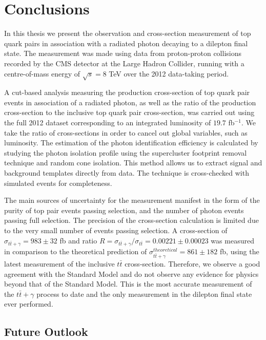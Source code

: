 \chapter*{Conclusions}\label{chap-conclusions}

In this thesis we present the observation and cross-section measurement of top quark pairs in association with a radiated photon decaying to a dilepton final state. The measurement was made using data from proton-proton collisions recorded by the CMS detector at the Large Hadron Collider, running with a centre-of-mass energy of $\sqrt{s} = 8$ TeV over the 2012 data-taking period. 

A cut-based analysis measuring the production cross-section of top quark pair events in association of a radiated photon, as well as the ratio of the production cross-section to the inclusive top quark pair cross-section, was carried out using the full 2012 dataset corresponding to an integrated luminosity of $19.7$ fb$^{-1}$. We take the ratio of cross-sections in order to cancel out global variables, such as luminosity. The estimation of the photon identification efficiency is calculated by studying the photon isolation profile using the supercluster footprint removal technique and random cone isolation. This method allows us to extract signal and background templates directly from data. The technique is cross-checked with simulated events for completeness. 

The main sources of uncertainty for the measurement manifest in the form of the purity of top pair events passing selection, and the number of photon events passing full selection. The precision of the cross-section calculation is limited due to the very small number of events passing selection. A cross-section of $\sigma_{t\bar{t}+\gamma} = 983 \pm 32$ fb and ratio $R = \sigma_{t\bar{t}+\gamma}/\sigma_{t\bar{t}} = 0.00221 \pm 0.00023$ was measured in comparison to the theoretical prediction of $\sigma_{t\bar{t}+\gamma}^{theoretical} = 861 \pm 182$ fb, using the latest measurement of the inclusive $t\bar{t}$ cross-section. Therefore, we observe a good agreement with the Standard Model and do not observe any evidence for physics beyond that of the Standard Model. This is the most accurate measurement of the $t\bar{t}+\gamma$ process to date and the only measurement in the dilepton final state ever performed.  


\section{Future Outlook}

